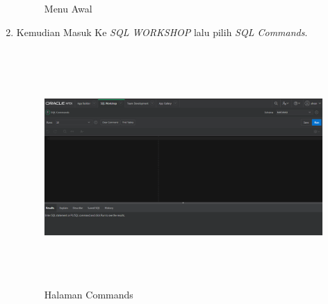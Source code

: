 \begin{enumerate}
\begin{figure}[!htbp]
\caption{Menu Awal}
\label{penanda}
\end{figure}
    \item Kemudian Masuk Ke \textit{SQL WORKSHOP} lalu pilih \textit{SQL Commands}.
\begin{figure}[!htbp]
\centering
\includegraphics[width=13cm,height=9cm]{figures/B.PNG}
\caption{Halaman Commands}
\label{penanda}
\end{figure}


\end{enumerate}
